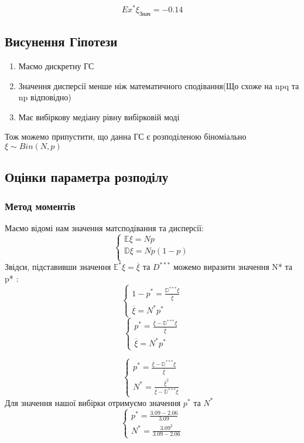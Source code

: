 \documentclass{article}
\begin{document}
$$Ex^*\xi_{\textrm{Знач}} = -0.14$$

\newpage
\subsection{Висунення Гіпотези}
\begin{enumerate}
    \item Маємо дискретну ГС
    \item Значення дисперсії менше ніж математичного сподівання(Що схоже на npq та np відповідно)
    \item Має вибіркову медіану рівну вибірковій моді
\end{enumerate}
Тож можемо припустити, що данна ГС є розподіленою біноміально \\ $\xi \sim Bin(N, p)$
\newpage
\subsection{Оцінки параметра розподілу}
\subsubsection{Метод моментів}
Маємо відомі нам значення матсподівання та дисперсії:
$$
\begin{cases}
    \mathbb{E}\xi=Np \\
    \mathbb{D}\xi=Np(1-p)\\
\end{cases}
$$
Звідси, підставивши значення $\mathbb{E}^*\xi = \overline{\xi}$ та $D^{***}$ можемо виразити
значення N* та p* :
$$
\begin{cases}
    1-p^* = \frac{\mathbb{D}^{***}\xi}{\overline{\xi}}\\
    \overline{\xi} = N^*p^*
\end{cases}
$$
$$
\begin{cases}
    p^* = \frac{\overline{\xi} - \mathbb{D}^{***}\xi}{\overline{\xi}}\\
    \overline{\xi} = N^*p^*
\end{cases}
$$

$$
\begin{cases}
    p^* = \frac{\overline{\xi} - \mathbb{D}^{***}\xi}{\overline{\xi}}\\
    N^* = \frac{\overline{\xi}^2}{\overline{\xi} - \mathbb{D}^{***}\xi}
\end{cases}
$$
Для значення нашої вибірки отримуємо значення $p^*$ та $N^*$
$$
\begin{cases}
    p^* = \frac{3.09 - 2.06}{3.09} \\
    N^* = \frac{3.09^2}{3.09 - 2.06} 
\end{cases}
$$
\end{document}
